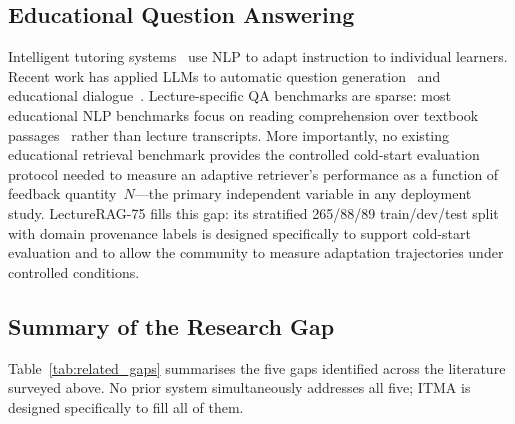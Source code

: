 \documentclass[journal]{IEEEtran}
\begin{document}
\subsection{Educational Question Answering}
Intelligent tutoring systems~\cite{graesser2004autotutor} use NLP to adapt
instruction to individual learners.  Recent work has applied LLMs to
automatic question generation~\cite{kurdi2020systematic} and educational
dialogue~\cite{wollny2021we}.  Lecture-specific QA benchmarks are sparse:
most educational NLP benchmarks focus on reading comprehension over
textbook passages~\cite{karpukhin2020dpr} rather than lecture transcripts.
More importantly, no existing educational retrieval benchmark provides the
controlled cold-start evaluation protocol needed to measure an adaptive
retriever's performance as a function of feedback quantity~$N$---the
primary independent variable in any deployment study.  LectureRAG-75 fills
this gap: its stratified 265/88/89 train/dev/test split with domain
provenance labels is designed specifically to support cold-start evaluation
and to allow the community to measure adaptation trajectories under
controlled conditions.

\subsection{Summary of the Research Gap}
Table~\ref{tab:related_gaps} summarises the five gaps identified across the
literature surveyed above.  No prior system simultaneously addresses all
five; ITMA is designed specifically to fill all of them.

\begin{table}[!htbp]
\centering
\caption{Research Gaps in Prior Adaptive RAG Work and ITMA's Coverage.
\checkmark~=~addressed; $\times$~=~not addressed.  Rows 1--2 are mutually
exclusive for all prior systems: adaptive systems require retraining
(Row~2), while non-adaptive systems are static (Row~1 only).  ITMA is the
only system satisfying all five properties simultaneously.}
\label{tab:related_gaps}
\setlength{\tabcolsep}{3pt}
\footnotesize
{}
\end{table}
\end{document}
